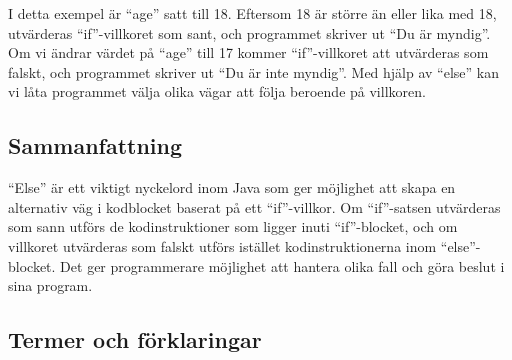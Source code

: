 I detta exempel är ``age'' satt till 18. Eftersom 18 är större än eller
lika med 18, utvärderas ``if''-villkoret som sant, och programmet
skriver ut ``Du är myndig''. Om vi ändrar värdet på ``age'' till 17
kommer ``if''-villkoret att utvärderas som falskt, och programmet
skriver ut ``Du är inte myndig''. Med hjälp av ``else'' kan vi låta
programmet välja olika vägar att följa beroende på villkoren.

\hypertarget{sammanfattning}{%
\subsection{Sammanfattning}\label{sammanfattning}}

``Else'' är ett viktigt nyckelord inom Java som ger möjlighet att skapa
en alternativ väg i kodblocket baserat på ett ``if''-villkor. Om
``if''-satsen utvärderas som sann utförs de kodinstruktioner som ligger
inuti ``if''-blocket, och om villkoret utvärderas som falskt utförs
istället kodinstruktionerna inom ``else''-blocket. Det ger programmerare
möjlighet att hantera olika fall och göra beslut i sina program.

\hypertarget{termer-och-fuxf6rklaringar}{%
\subsection{Termer och förklaringar}\label{termer-och-fuxf6rklaringar}}

